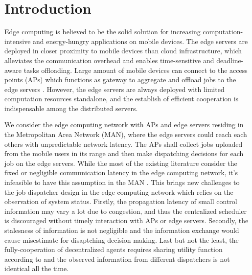 
\section{Introduction}
Edge computing is believed to be the solid solution for increasing computation-intensive and energy-hungry applications on mobile devices.
The edge servers are deployed in closer proximity to mobile devices than cloud infrastructure, which alleviates the communication overhead and enables {time-sensitive} and {deadline-aware} tasks offloading.
Large amount of mobile devices can connect to the access points (APs) which functions as gateway to aggregate and offload jobs to the edge servers \cite{MEC-SURVEY}.
However, the edge servers are always deployed with limited computation resources standalone, and the establish of efficient cooperation is indispensable among the distributed servers.

We consider the edge computing network with APs and edge servers residing in the Metropolitan Area Network (MAN), where the edge servers could reach each others with unpredictable network latency\cite{MOBIHOC19-ZhouZ,tan-online,IOTJ18-FanQ}.
The APs shall collect jobs uploaded from the mobile users in its range and then make dispatching decisions for each job on the edge servers.
While the most of the existing literature consider the fixed or negligible communication latency in the edge computing network\cite{TOC19-LiuC,JSAC19-AlameddineHA,tan-online}, it's infeasible to have this assumption in the MAN \cite{MAN-LATENCY}.
This brings new challenges to the job dispatcher design in the edge computing network which relies on the observation of system status.
Firstly, the propagation latency of small control information may vary a lot due to congestion, and thus the centralized scheduler is discouraged without timely interaction with APs or edge servers.
Secondly, the stalesness of information is not negligible and the information exchange would cause misestimate for disaptching decision making.
Last but not the least, the fully-cooperation of decentralized agents requires sharing utility function according to \cite{IJCAI03-NairR} and the observed information from different dispatchers is not identical all the time.

